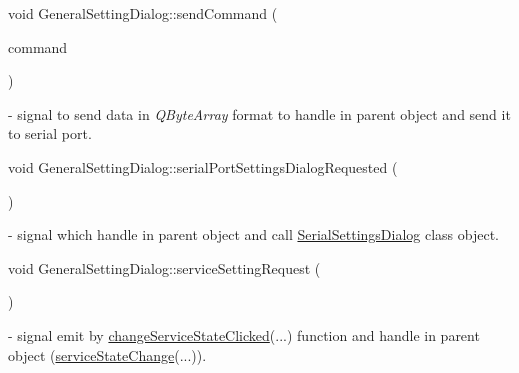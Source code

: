 \mbox{\label{classGeneralSettingDialog_aa381596bc44cfcaeb85a8d906b877b86}} 
{\footnotesize\ttfamily void General\+Setting\+Dialog\+::\texorpdfstring{send\+Command}{sendCommand} (\begin{DoxyParamCaption}\item[{Q\+Byte\+Array}]{command }\end{DoxyParamCaption}){\ttfamily [signal]}} - signal to send data in \textit{Q\+Byte\+Array} format to handle in parent object and send it to serial port.

\mbox{\label{classGeneralSettingDialog_aef493e3f166d3bd7cb982f854f29617e}} 
{\footnotesize\ttfamily void General\+Setting\+Dialog\+::\texorpdfstring{serial\+Port\+Settings\+Dialog\+Requested}{serialPortSettingsDialogRequested} (\begin{DoxyParamCaption}{ }\end{DoxyParamCaption}){\ttfamily [signal]}} - signal which handle in parent object and call \hyperlink{classSerialSettingsDialog}{Serial\+Settings\+Dialog} class object.

\mbox{\label{classGeneralSettingDialog_a8ac7f5a379cd6ec270bc98050e4c7765}} 
{\footnotesize\ttfamily void General\+Setting\+Dialog\+::\texorpdfstring{service\+Setting\+Request}{serviceSettingRequest} (\begin{DoxyParamCaption}{ }\end{DoxyParamCaption}){\ttfamily [signal]}} - signal emit by \hyperlink{classGeneralSettingDialog_ad5275b9ede5252e57d4b6a44eb771a04}{change\+Service\+State\+Clicked}(...) function and handle in parent object (\hyperlink{classMainWindow_a6390c39f77f17e86c59a4c8f8bf0e607}{service\+State\+Change}(...)).

